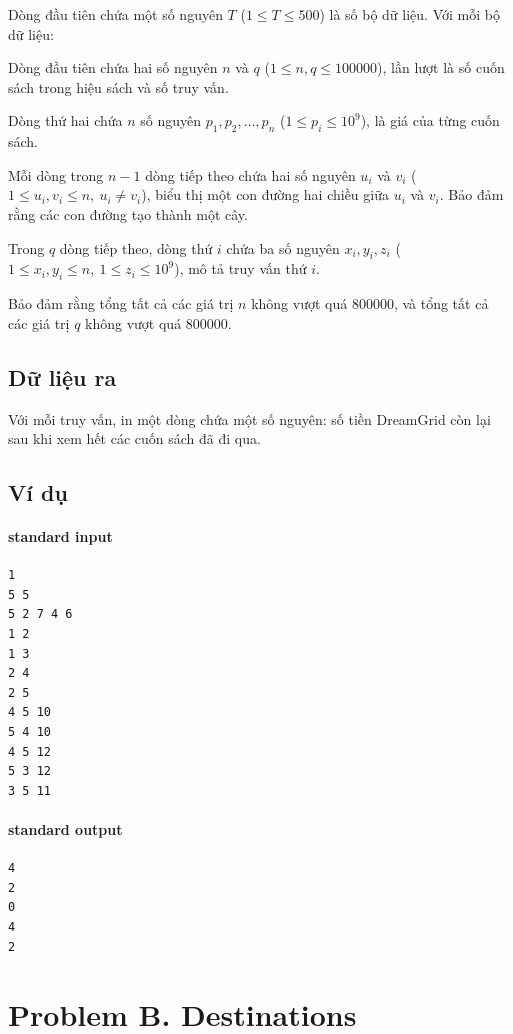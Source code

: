 \documentclass[11pt]{article}
\begin{document}
Dòng đầu tiên chứa một số nguyên \(T\) (\(1\le T\le 500\)) là số bộ dữ liệu.
Với mỗi bộ dữ liệu:

Dòng đầu tiên chứa hai số nguyên \(n\) và \(q\)
(\(1\le n,q\le 100000\)), lần lượt là số cuốn sách trong hiệu sách và số
truy vấn.

Dòng thứ hai chứa \(n\) số nguyên \(p_1,p_2,\ldots,p_n\)
(\(1\le p_i\le 10^9\)), là giá của từng cuốn sách.

Mỗi dòng trong \(n-1\) dòng tiếp theo chứa hai số nguyên \(u_i\) và \(v_i\)
(\(1\le u_i,v_i\le n,\ u_i\ne v_i\)), biểu thị một con đường hai chiều giữa
\(u_i\) và \(v_i\). Bảo đảm rằng các con đường tạo thành một cây.

Trong \(q\) dòng tiếp theo, dòng thứ \(i\) chứa ba số nguyên \(x_i,y_i,z_i\)
(\(1\le x_i,y_i\le n,\ 1\le z_i\le 10^9\)), mô tả truy vấn thứ \(i\).

Bảo đảm rằng tổng tất cả các giá trị \(n\) không vượt quá \(800000\), và tổng
tất cả các giá trị \(q\) không vượt quá \(800000\).

\subsection*{Dữ liệu ra}

Với mỗi truy vấn, in một dòng chứa một số nguyên: số tiền DreamGrid còn lại
sau khi xem hết các cuốn sách đã đi qua.

\subsection*{Ví dụ}

\paragraph{standard input}
\begin{verbatim}
1
5 5
5 2 7 4 6
1 2
1 3
2 4
2 5
4 5 10
5 4 10
4 5 12
5 3 12
3 5 11
\end{verbatim}

\paragraph{standard output}
\begin{verbatim}
4
2
0
4
2
\end{verbatim}

\section{Problem B. Destinations}
\end{document}
